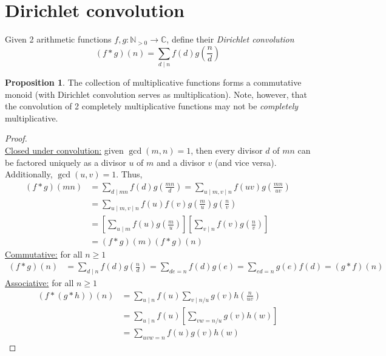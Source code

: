 \documentclass{article}
\theoremstyle{definition}
\newtheorem{proposition}[theorem]{Proposition}
\begin{document}
\newpage

\section{Dirichlet convolution}
Given 2 arithmetic functions $f, g: \mathbb{N}_{> 0} \to \mathbb{C}$, define their \emph{Dirichlet convolution}
$$(f * g) (n) = \sum_{d \mid n} f(d) g \left( \frac{n}{d} \right)$$
\begin{proposition}
The collection of multiplicative functions forms a commutative monoid (with Dirichlet convolution serves as multiplication). Note, however, that the convolution of 2 completely multiplicative functions may not be \textit{completely} multiplicative.
\end{proposition}
\begin{proof} \ \\
\underline{Closed under convolution:} given $\gcd(m, n) = 1$, then every divisor $d$ of $mn$ can be factored uniquely as a divisor $u$ of $m$ and a divisor $v$ (and vice versa). Additionally, $\gcd(u, v) = 1$. Thus,
\begin{align*}
(f * g) (mn) & = \sum_{d \mid mn} f \left( d \right) g \left( \frac{mn}{d} \right) = \sum_{u \mid m, v \mid n} f \left( uv \right) g \left( \frac{mn}{uv} \right)
\\
& = \sum_{u \mid m, v \mid n} f \left( u \right) f \left( v \right) g \left( \frac{m}{u} \right) g \left( \frac{n}{v} \right)
\\
& = \left[ \sum_{u \mid m} f \left( u \right) g \left( \frac{m}{u} \right) \right] \left[ \sum_{v \mid n} f \left( v \right) g \left( \frac{n}{v} \right) \right]
\\
& = (f * g)(m) (f * g)(n)
\end{align*}
\underline{Commutative:} for all $n \geq 1$
\begin{align*}
(f * g)(n) & = \sum_{d \mid n} f \left( d \right) g \left( \frac{n}{d} \right) = \sum_{de = n} f \left( d \right) g \left( e \right) = \sum_{ed = n} g \left( e \right) f \left( d \right) = (g * f)(n)
\end{align*}
\underline{Associative:} for all $n \geq 1$
\begin{align*}
(f * (g * h))(n) & = \sum_{u \mid n} f \left( u \right) \sum_{v \mid n/u} g \left( v \right) h \left( \frac{n}{uv} \right)
\\
& = \sum_{u \mid n} f \left( u \right) \left[ \sum_{vw=n/u} g \left( v \right) h \left( w \right) \right]
\\
& = \sum_{uvw=n} f \left( u \right) g \left( v \right) h \left( w \right)

\end{align*}
\end{proof}
\end{document}
